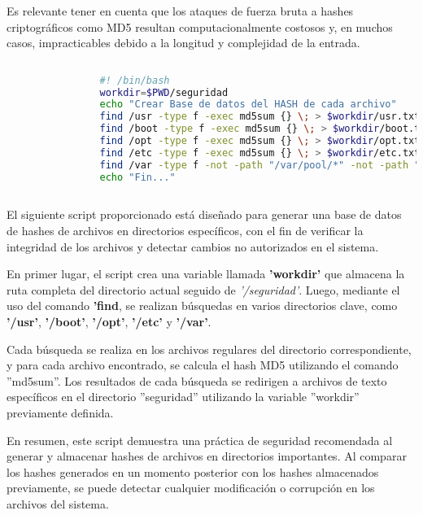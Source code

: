 			Es relevante tener en cuenta que los ataques de fuerza bruta a hashes criptográficos como MD5 resultan computacionalmente costosos y, en muchos casos, impracticables debido a la longitud y complejidad de la entrada.\par
			
							\vspace{0.3cm}
			\begin{lstlisting}[language=Bash, caption=Generar Hash]
				
				#! /bin/bash
				workdir=$PWD/seguridad
				echo "Crear Base de datos del HASH de cada archivo"
				find /usr -type f -exec md5sum {} \; > $workdir/usr.txt
				find /boot -type f -exec md5sum {} \; > $workdir/boot.txt
				find /opt -type f -exec md5sum {} \; > $workdir/opt.txt
				find /etc -type f -exec md5sum {} \; > $workdir/etc.txt
				find /var -type f -not -path "/var/pool/*" -not -path "/var/log/*" -not -path "/var/tmp/*" -exec md5sum {} \; > $workdir/var.txt
				echo "Fin..."
				
			\end{lstlisting}
			
			El siguiente script proporcionado está diseñado para generar una base de datos de hashes de archivos en directorios específicos, con el fin de verificar la integridad de los archivos y detectar cambios no autorizados en el sistema.\par
			
			En primer lugar, el script crea una variable llamada \textbf{'workdir'} que almacena la ruta completa del directorio actual seguido de \textit{'/seguridad'}. Luego, mediante el uso del comando \textbf{'find}, se realizan búsquedas en varios directorios clave, como \textbf{'/usr'}, \textbf{'/boot'}, \textbf{'/opt'}, \textbf{'/etc'} y \textbf{'/var'}.
			
			Cada búsqueda se realiza en los archivos regulares del directorio correspondiente, y para cada archivo encontrado, se calcula el hash MD5 utilizando el comando ''md5sum''. Los resultados de cada búsqueda se redirigen a archivos de texto específicos en el directorio ''seguridad'' utilizando la variable ''workdir'' previamente definida.
			
			En resumen, este script demuestra una práctica de seguridad recomendada al generar y almacenar hashes de archivos en directorios importantes. Al comparar los hashes generados en un momento posterior con los hashes almacenados previamente, se puede detectar cualquier modificación o corrupción en los archivos del sistema.
			
